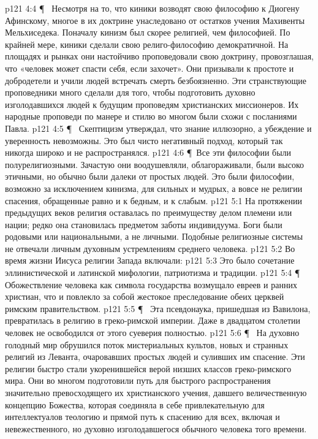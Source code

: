 \vs p121 4:4 \P\ \bibnobreakspace {} Несмотря на то, что киники возводят свою философию к Диогену Афинскому, многое в их доктрине унаследовано от остатков учения Махивенты Мельхиседека. Поначалу кинизм был скорее религией, чем философией. По крайней мере, киники сделали свою религо\hyp{}философию демократичной. На площадях и рынках они настойчиво проповедовали свою доктрину, провозглашая, что «человек может спасти себя, если захочет». Они призывали к простоте и добродетели и учили людей встречать смерть безбоязненно. Эти странствующие проповедники много сделали для того, чтобы подготовить духовно изголодавшихся людей к будущим проповедям христианских миссионеров. Их народные проповеди по манере и стилю во многом были схожи с посланиями Павла.
\vs p121 4:5 \P\ \bibnobreakspace {} Скептицизм утверждал, что знание иллюзорно, а убеждение и уверенность невозможны. Это был чисто негативный подход, который так никогда широко и не распространялся.
\vs p121 4:6 \P\ Все эти философии были полурелигиозными. Зачастую они воодушевляли, облагораживали, были высоко этичными, но обычно были далеки от простых людей. Это были философии, возможно за исключением кинизма, для сильных и мудрых, а вовсе не религии спасения, обращенные равно и к бедным, и к слабым.
\vs p121 5:1 На протяжении предыдущих веков религия оставалась по преимуществу делом племени или нации; редко она становилась предметом заботы индивидуума. Боги были родовыми или национальными, а не личными. Подобные религиозные системы не отвечали личным духовным устремлениям среднего человека.
\vs p121 5:2 Во время жизни Иисуса религии Запада включали:
\vs p121 5:3 \bibnobreakspace {} Это было сочетание эллинистической и латинской мифологии, патриотизма и традиции.
\vs p121 5:4 \P\ \bibnobreakspace {} Обожествление человека как символа государства возмущало евреев и ранних христиан, что и повлекло за собой жестокое преследование обеих церквей римским правительством.
\vs p121 5:5 \P\ \bibnobreakspace {} Эта псевдонаука, пришедшая из Вавилона, превратилась в религию в греко\hyp{}римской империи. Даже в двадцатом столетии человек не освободился от этого суеверия полностью.
\vs p121 5:6 \P\ \bibnobreakspace {} На духовно голодный мир обрушился поток мистериальных культов, новых и странных религий из Леванта, очаровавших простых людей и суливших им  спасение. Эти религии быстро стали укоренившейся верой низших классов греко\hyp{}римского мира. Они во многом подготовили путь для быстрого распространения значительно превосходящего их христианского учения, давшего величественную концепцию Божества, которая соединяла в себе привлекательную для интеллектуалов теологию и прямой путь к спасению для всех, включая и невежественного, но духовно изголодавшегося обычного человека того времени.
